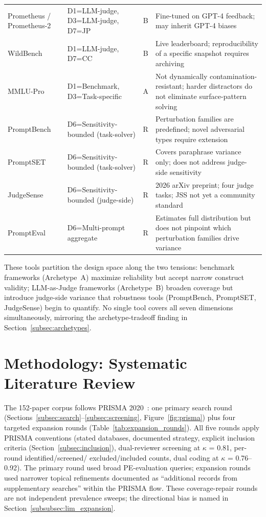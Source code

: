 \documentclass[acmsmall, nonacm, screen]{acmart}
\begin{document}
\begin{table}[!htbp]
\begin{tabular}{p{2.8cm} p{3.8cm} c p{4.6cm}}
Prometheus / Prometheus-2 \cite{kim2024prometheus}
  & D1=LLM-judge, D3=LLM-judge, D7=JP
  & B
  & Fine-tuned on GPT-4 feedback; may inherit GPT-4 biases \\
WildBench \cite{wildbench2024}
  & D1=LLM-judge, D7=CC
  & B
  & Live leaderboard; reproducibility of a specific snapshot requires archiving \\
MMLU-Pro \cite{mmluprob2024}
  & D1=Benchmark, D3=Task-specific
  & A
  & Not dynamically contamination-resistant; harder distractors do not eliminate surface-pattern solving \\
PromptBench \cite{promptbench2023}
  & D6=Sensitivity-bounded (task-solver)
  & R
  & Perturbation families are predefined; novel adversarial types require extension \\
PromptSET \cite{promptsensitivity2025}
  & D6=Sensitivity-bounded (task-solver)
  & R
  & Covers paraphrase variance only; does not address judge-side sensitivity \\
JudgeSense \cite{bellibatlu2026judgesense}
  & D6=Sensitivity-bounded (judge-side)
  & R
  & 2026 arXiv preprint; four judge tasks; JSS not yet a community standard \\
PromptEval \cite{polo2024promptseval}
  & D6=Multi-prompt aggregate
  & R
  & Estimates full distribution but does not pinpoint which perturbation families drive variance \\
\bottomrule
\end{tabular}
\end{table}

These tools partition the design space along the two tensions:
benchmark frameworks (Archetype~A) maximize reliability but accept
narrow construct validity; LLM-as-Judge frameworks (Archetype~B)
broaden coverage but introduce judge-side variance that robustness
tools (PromptBench, PromptSET, JudgeSense) begin to quantify. No
single tool covers all seven dimensions simultaneously, mirroring
the archetype-tradeoff finding in
Section~\ref{subsec:archetypes}.

\section{Methodology: Systematic Literature Review}
\label{sec:methodology}
The 152-paper corpus follows PRISMA 2020~\cite{page2021prisma}: one
primary search round (Sections~\ref{subsec:search}--\ref{subsec:screening},
Figure~\ref{fig:prisma}) plus four targeted expansion rounds
(Table~\ref{tab:expansion_rounds}). All five rounds apply PRISMA
conventions (stated databases, documented strategy, explicit
inclusion criteria (Section~\ref{subsec:inclusion}), dual-reviewer
screening at $\kappa$ = 0.81, per-round identified/screened/
excluded/included counts, dual coding at $\kappa$ = 0.76--0.92). The
primary round used broad PE-evaluation queries; expansion rounds
used narrower topical refinements documented as ``additional records
from supplementary searches'' within the PRISMA flow. These
coverage-repair rounds are not independent prevalence sweeps; the
directional bias is named in
Section~\ref{subsubsec:lim_expansion}.
\end{document}

